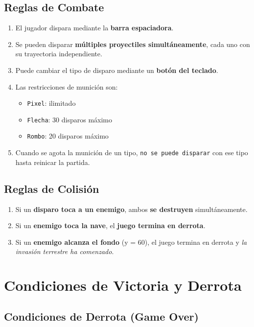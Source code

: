 \documentclass[12pt, a4paper]{article}
\begin{document}
\subsection{Reglas de Combate}

\begin{enumerate}[leftmargin=2em]
    \item El jugador dispara mediante la \textbf{barra espaciadora}.
    \item Se pueden disparar \textbf{múltiples proyectiles simultáneamente}, cada uno con su trayectoria independiente.
    \item Puede cambiar el tipo de disparo mediante un \textbf{botón del teclado}.
    \item Las restricciones de munición son:
        \begin{itemize}[leftmargin=2em]
            \item \texttt{Pixel}: ilimitado
            \item \texttt{Flecha}: 30 disparos máximo
            \item \texttt{Rombo}: 20 disparos máximo
        \end{itemize}
    \item Cuando se agota la munición de un tipo, \texttt{no se puede disparar} con ese tipo hasta reinicar la partida.
\end{enumerate}

\subsection{Reglas de Colisión}

\begin{enumerate}[leftmargin=2em]
    \item Si un \textbf{disparo toca a un enemigo}, ambos \textbf{se destruyen} simultáneamente.
    \item Si un \textbf{enemigo toca la nave}, el \textbf{juego termina en derrota}.
    \item Si un \textbf{enemigo alcanza el fondo} (y = 60), el juego termina en derrota y \textit{la invasión terrestre ha comenzado}.
\end{enumerate}

\section{Condiciones de Victoria y Derrota}

\subsection{Condiciones de Derrota (Game Over)}
\end{document}
